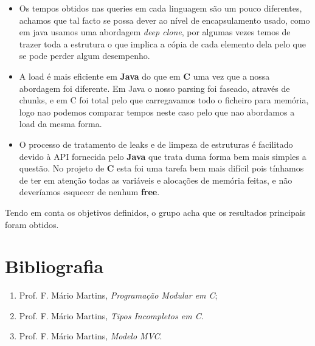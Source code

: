 \documentclass[a4paper]{article}
\begin{document}
\begin{itemize}
  \item Os tempos obtidos nas queries em cada linguagem são um pouco diferentes, achamos que 
  tal facto se possa dever ao nível de encapsulamento usado, como em java usamos uma 
  abordagem \textit{deep clone}, por algumas vezes temos de trazer toda a estrutura o 
  que implica a cópia de cada elemento dela pelo que se pode perder algum desempenho.

  \item A load é mais eficiente em \textbf{Java} do que em \textbf{C} uma vez que a nossa 
  abordagem foi diferente. Em Java o nosso parsing foi faseado, através de chunks, e em C 
  foi total pelo que carregavamos todo o ficheiro para memória, logo nao podemos comparar 
  tempos neste caso pelo que nao abordamos a load da mesma forma.

  \item O processo de tratamento de leaks e de limpeza de estruturas é facilitado devido 
  à API fornecida pelo \textbf{Java} que trata duma forma bem mais simples a questão. No 
  projeto de \textbf{C} esta foi uma tarefa bem mais difícil pois tínhamos de ter em atenção 
  todas as variáveis e alocações de memória feitas, e não deveríamos esquecer de nenhum 
  \textbf{free}.
\end{itemize}

Tendo em conta os objetivos definidos, o grupo acha que os resultados 
principais foram obtidos.


\section{Bibliografia}

\begin{enumerate} 
	\item Prof. F. Mário Martins, \textit{Programação Modular em C};
	\item Prof. F. Mário Martins, \textit{Tipos Incompletos em C}.
  \item Prof. F. Mário Martins, \textit{Modelo MVC}.
\end{enumerate}
\end{document}
